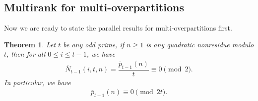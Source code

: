 \documentclass[12pt]{amsart}
\numberwithin{equation}{section}
\theoremstyle{plain}
\newtheorem{theorem}{Theorem}[section]
\theoremstyle{definition}
\begin{document}
\subsection{Multirank for multi-overpartitions}
Now we are ready to state the parallel results for multi-overpartitions first.
\begin{theorem}\label{thm:multi-over}
Let $t$ be any odd prime, if $n\geq 1$ is any quadratic nonresidue modulo $t$, then for all $0\leq i\leq t-1$, we have
\begin{align}\label{rank:multi-over}
\overline{N}_{t-1}(i,t,n)=\dfrac{\overline{p}_{t-1}(n)}{t}\equiv 0 \pmod 2.
\end{align}
In particular, we have
\begin{align}\label{cong:multi-over}
\overline{p}_{t-1}(n)\equiv0\pmod{2t}.
\end{align}
\end{theorem}
\end{document}
